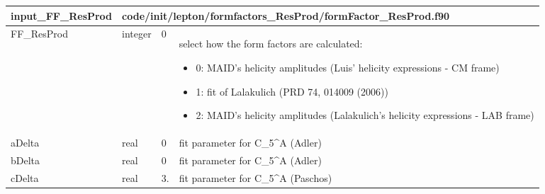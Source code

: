 \documentclass{article}
\begin{document}
\begin{longtable}{llll}
\toprule
\textbf{\large{input\_FF\_ResProd}} & \multicolumn{3}{l}{\footnotesize{code/init/lepton/formfactors\_ResProd/formFactor\_ResProd.f90}}\\*
\midrule
\endfirsthead
\midrule
\endhead
FF\_ResProd & \begin{minipage}[t]{2cm}integer\end{minipage} & \begin{minipage}[t]{2cm}0\end{minipage} & \begin{minipage}[t]{12cm}select how the form factors are calculated:\begin{itemize}\leftmargin0em\itemindent0pt\item 0: MAID's helicity amplitudes (Luis' helicity expressions - CM frame)\item 1: fit of Lalakulich (PRD 74, 014009 (2006))\item 2: MAID's helicity amplitudes (Lalakulich's helicity expressions   - LAB frame)\end{itemize}\end{minipage}\\*
\midrule
aDelta & \begin{minipage}[t]{2cm}real\end{minipage} & \begin{minipage}[t]{2cm}0\end{minipage} & \begin{minipage}[t]{12cm}fit parameter for C\_5\^{}A (Adler)\end{minipage}\\*
\midrule
bDelta & \begin{minipage}[t]{2cm}real\end{minipage} & \begin{minipage}[t]{2cm}0\end{minipage} & \begin{minipage}[t]{12cm}fit parameter for C\_5\^{}A (Adler)\end{minipage}\\*
\midrule
cDelta & \begin{minipage}[t]{2cm}real\end{minipage} & \begin{minipage}[t]{2cm}3.\end{minipage} & \begin{minipage}[t]{12cm}fit parameter for C\_5\^{}A (Paschos)\end{minipage}\\*

\end{longtable}
\end{document}
